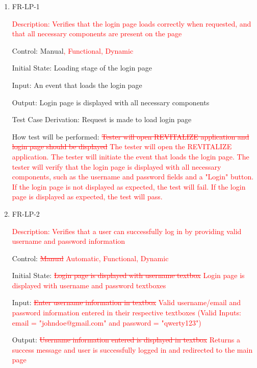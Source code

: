 \documentclass[12pt, titlepage]{article}
\begin{document}
\begin{enumerate}
	
	\item{FR-LP-1\\}

        \textcolor{red}{Description: Verifies that the login page loads correctly when requested, and that all necessary components are present on the page}
	
	Control: Manual\textcolor{red}{, Functional, Dynamic}
	
	Initial State: Loading stage of the login page
	
	Input: An event that loads the login page
	
	Output: Login page is displayed with all necessary components
	
	Test Case Derivation: Request is made to load login page
	
	How test will be performed: \textcolor{red}{\sout{Tester will open REVITALIZE application and login page should be displayed}} \textcolor{red}{The tester will open the REVITALIZE application. The tester will initiate the event that loads the login page.
        The tester will verify that the login page is displayed with all necessary components, such as the username and password fields and a "Login" button.
        If the login page is not displayed as expected, the test will fail.
        If the login page is displayed as expected, the test will pass.}
        
	\item{FR-LP-2\\}

        \textcolor{red}{Description: Verifies that a user can successfully log in by providing valid username and password information}
	
	Control: \textcolor{red}{\sout{Manual}} \textcolor{red}{Automatic, Functional, Dynamic}
	
	Initial State: \textcolor{red}{\sout{Login page is displayed with username textbox}} \textcolor{red}{Login page is displayed with username and password textboxes}
	
 Input:  \textcolor{red}{\sout{Enter username information in textbox}} \textcolor{red}{Valid username/email and password information entered in their respective textboxes (Valid Inputs: email = "johndoe@gmail.com" and password = "qwerty{}123") }
	
	Output: \textcolor{red}{\sout{Username information entered is displayed in textbox}}
        \textcolor{red}{Returns a success message and user is successfully logged in and redirected to the main page}
 

\end{enumerate}
\end{document}
